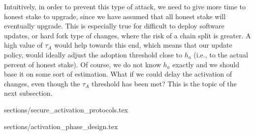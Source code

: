 {{Intuitively, in order to prevent this type of attack, we need to give more time to honest stake to upgrade, since we have assumed that all honest stake will eventually upgrade. This is especially true for difficult to deploy software updates, or hard fork type of changes, where the risk of a chain split is greater. A high value of $\tau_A$ would help towards this end, which means that our update policy, would ideally adjust the adoption threshold close to $h_a$ (i.e., to the actual percent of honest stake). Of course, we do not know $h_a$ exactly and we should base it on some sort of estimation. What if we could delay the activation of changes, even though the $\tau_A$ threshold has been met? This is the topic of the next subsection. 
}



} %

{sections/secure_activation_protocols.tex}

{sections/activation_phase_design.tex}

